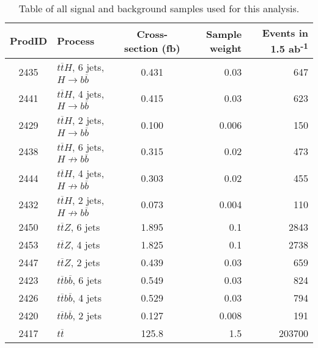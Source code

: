 
\begin{table}[htp]
\centering
	\begin{tabular}{ c l c r r }
	\hline \hline
	ProdID & Process & Cross-section (fb) & Sample weight & Events in 1.5 ab\textsuperscript{-1} \\ \hline \hline
	2435 & $t\overline{t}H$, 6 jets, $H \rightarrow b\overline{b}$ & 0.431 & 0.03 & 647 \\
	2441 & $t\overline{t}H$, 4 jets, $H \rightarrow b\overline{b}$ & 0.415 & 0.03 & 623 \\ \hline
	2429 & $t\overline{t}H$, 2 jets, $H \rightarrow b\overline{b}$ & 0.100 & 0.006 & 150 \\

	2438 & $t\overline{t}H$, 6 jets, $H \not\rightarrow b\overline{b}$ & 0.315 & 0.02 & 473	 \\
	2444 & $t\overline{t}H$, 4 jets, $H \not\rightarrow b\overline{b}$ & 0.303 & 0.02 & 455 \\
	2432 & $t\overline{t}H$, 2 jets, $H \not\rightarrow b\overline{b}$ & 0.073 & 0.004 & 110 \\

	2450 & $t\overline{t}Z$, 6 jets & 1.895 & 0.1 & 2843 \\
	2453 & $t\overline{t}Z$, 4 jets & 1.825 & 0.1 & 2738 \\
	2447 & $t\overline{t}Z$, 2 jets & 0.439 & 0.03 & 659 \\
	
	2423 & $t\overline{t}b\overline{b}$, 6 jets & 0.549 & 0.03 & 824 \\
	2426 & $t\overline{t}b\overline{b}$, 4 jets & 0.529 & 0.03 & 794 \\
	2420 & $t\overline{t}b\overline{b}$, 2 jets & 0.127 & 0.008 & 191 \\

	2417 & $t\overline{t}$ & 125.8 & 1.5 & 203700 \\ \hline

	\end{tabular}
	\caption{Table of all signal and background samples used for this analysis.}
	\label{table:physics/SM/generatedsamples}
\end{table}

